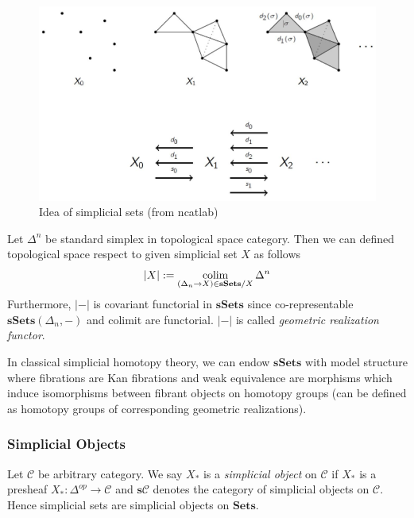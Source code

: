 \documentclass[b5paper,11pt]{article}
\begin{document}
\begin{figure}[h]
	\caption{Idea of simplicial sets (from ncatlab)}
\centering\includegraphics[scale=0.5]{PIC/SimplicialSetsIdea.jpg}
\end{figure}

Let $\Delta^n$ be standard simplex in topological space category. Then we can defined topological space respect to given simplicial set $X$ as follows
\[
|X| := \operatorname*{colim}_{(\Delta_n \to X) \in \mathbf{sSets}/X} \Delta^n
\]
Furthermore, $|-|$ is covariant functorial in $\mathbf{sSets}$ since co-representable $\mathbf{sSets}(\Delta_n,-)$ and colimit are functorial. $|-|$ is called \emph{geometric realization functor}.

In classical simplicial homotopy theory, we can endow $\mathbf{sSets}$ with model structure where fibrations are Kan fibrations and weak equivalence are morphisms which induce isomorphisms between fibrant objects on homotopy groups (can be defined as homotopy groups of corresponding geometric realizations).
\subsubsection{Simplicial Objects}
Let $\mathcal{C}$ be arbitrary category. We say $X_*$ is a \emph{simplicial object} on $\mathcal{C}$ if $X_*$ is a presheaf $X_* \colon \Delta^{op} \to \mathcal{C}$ and $\mathbf{s}\mathcal{C}$ denotes the category of simplicial objects on $\mathcal{C}$. Hence simplicial sets are simplicial objects on $\mathbf{Sets}$. 
\end{document}
